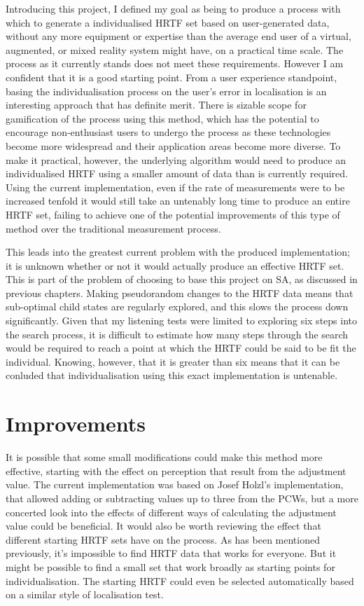 Introducing this project, I defined my goal as being to produce a process with which to generate a individualised HRTF set based on user-generated data, without any more equipment or expertise than the average end user of a virtual, augmented, or mixed reality system might have, on a practical time scale. The process as it currently stands does not meet these requirements. However I am confident that it is a good starting point. From a user experience standpoint, basing the individualisation process on the user's error in localisation is an interesting approach that has definite merit. There is sizable scope for gamification of the process using this method, which has the potential to encourage non-enthusiast users to undergo the process as these technologies become more widespread and their application areas become more diverse. To make it practical, however, the underlying algorithm would need to produce an individualised HRTF using a smaller amount of data than is currently required. Using the current implementation, even if the rate of measurements were to be increased tenfold it would still take an untenably long time to produce an entire HRTF set, failing to achieve one of the potential improvements of this type of method over the traditional measurement process. 

This leads into the greatest current problem with the produced implementation; it is unknown whether or not it would actually produce an effective HRTF set. This is part of the problem of choosing to base this project on SA, as discussed in previous chapters. Making pseudorandom changes to the HRTF data means that sub-optimal child states are regularly explored, and this slows the process down significantly. Given that my listening tests were limited to exploring six steps into the search process, it is difficult to estimate how many steps through the search would be required to reach a point at which the HRTF could be said to be fit the individual. Knowing, however, that it is greater than six means that it can be conluded that individualisation using this exact implementation is untenable.

\section{Improvements}

It is possible that some small modifications could make this method more effective, starting with the effect on perception that result from the adjustment value. The current implementation was based on Josef Holzl's implementation, that allowed adding or subtracting values up to three from the PCWs, but a more concerted look into the effects of different ways of calculating the adjustment value could be beneficial. It would also be worth reviewing the effect that different starting HRTF sets have on the process. As has been mentioned previously, it's impossible to find HRTF data that works for everyone. But it might be possible to find a small set that work broadly as starting points for individualisation. The starting HRTF could even be selected automatically based on a similar style of localisation test. 

